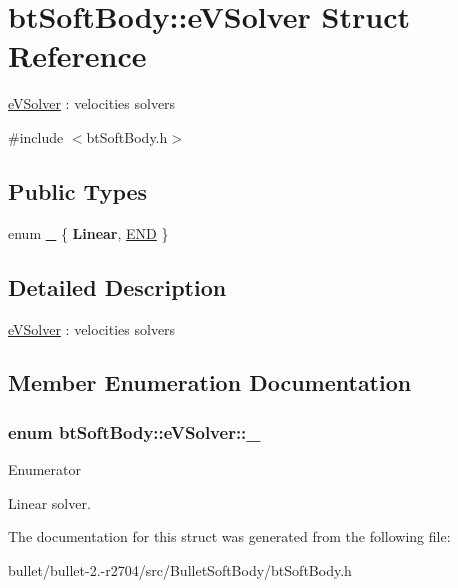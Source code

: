 \hypertarget{structbt_soft_body_1_1e_v_solver}{\section{bt\+Soft\+Body\+:\+:e\+V\+Solver Struct Reference}
\label{structbt_soft_body_1_1e_v_solver}
}


\hyperlink{structbt_soft_body_1_1e_v_solver}{e\+V\+Solver} \+: velocities solvers  




{\ttfamily \#include $<$bt\+Soft\+Body.\+h$>$}

\subsection*{Public Types}
\begin{DoxyCompactItemize}
\item 
enum \hyperlink{structbt_soft_body_1_1e_v_solver_ad6a7083f91529d75cab91506cd63e088}{\+\_\+} \{ {\bfseries Linear}, 
\hyperlink{structbt_soft_body_1_1e_v_solver_ad6a7083f91529d75cab91506cd63e088af9171d53f22882b6b27a94534ab72e01}{E\+N\+D}
 \}
\end{DoxyCompactItemize}


\subsection{Detailed Description}
\hyperlink{structbt_soft_body_1_1e_v_solver}{e\+V\+Solver} \+: velocities solvers 

\subsection{Member Enumeration Documentation}
\hypertarget{structbt_soft_body_1_1e_v_solver_ad6a7083f91529d75cab91506cd63e088}{
\subsubsection[{\+\_\+}]{\setlength{\rightskip}{0pt plus 5cm}enum {\bf bt\+Soft\+Body\+::e\+V\+Solver\+::\+\_\+}}}\label{structbt_soft_body_1_1e_v_solver_ad6a7083f91529d75cab91506cd63e088}
\begin{Desc}
\item[Enumerator]\par
\begin{description}
\item[{\em 
\hypertarget{structbt_soft_body_1_1e_v_solver_ad6a7083f91529d75cab91506cd63e088af9171d53f22882b6b27a94534ab72e01}{E\+N\+D}\label{structbt_soft_body_1_1e_v_solver_ad6a7083f91529d75cab91506cd63e088af9171d53f22882b6b27a94534ab72e01}
}]Linear solver. \end{description}
\end{Desc}


The documentation for this struct was generated from the following file\+:\begin{DoxyCompactItemize}
\item 
bullet/bullet-\/2.-\/r2704/src/\+Bullet\+Soft\+Body/bt\+Soft\+Body.\+h\end{DoxyCompactItemize}
